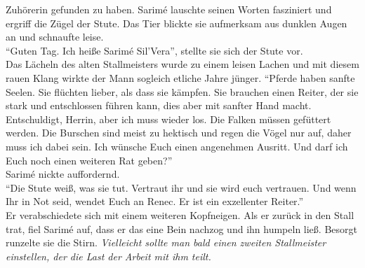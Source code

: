 Zuhörerin gefunden zu haben. Sarimé lauschte seinen Worten fasziniert und ergriff die Zügel der 
Stute. Das Tier blickte sie aufmerksam aus dunklen Augen an und schnaufte leise. \\
``Guten Tag. Ich heiße Sarimé Sil'Vera'', stellte sie sich der Stute vor. \\
Das Lächeln des alten Stallmeisters wurde zu einem leisen Lachen und mit diesem rauen Klang wirkte 
der Mann sogleich etliche Jahre jünger. ``Pferde haben sanfte Seelen. Sie flüchten lieber, als 
dass sie kämpfen. Sie brauchen einen Reiter, der sie stark und entschlossen führen kann, dies aber 
mit sanfter Hand macht. Entschuldigt, Herrin, aber ich muss wieder los. Die Falken müssen gefüttert 
werden. Die Burschen sind meist zu hektisch und regen die Vögel nur auf, daher muss ich dabei sein. 
Ich wünsche Euch einen angenehmen Ausritt. Und darf ich Euch noch einen weiteren Rat geben?''\\
Sarimé nickte auffordernd.\\
``Die Stute weiß, was sie tut. Vertraut ihr und sie wird euch vertrauen. Und wenn Ihr in Not seid, 
wendet Euch an Renec. Er ist ein exzellenter Reiter.''\\
Er verabschiedete sich mit einem weiteren Kopfneigen. Als er zurück in den Stall trat, fiel Sarimé 
auf, dass er das eine Bein nachzog und ihn humpeln ließ. Besorgt runzelte sie die Stirn. 
\textit{Vielleicht sollte man bald einen zweiten Stallmeister einstellen, der die Last der Arbeit 
mit ihm teilt.}\\

